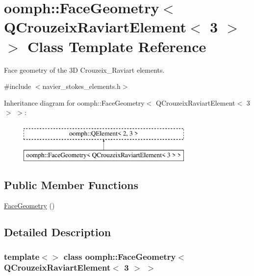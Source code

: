 \hypertarget{classoomph_1_1FaceGeometry_3_01QCrouzeixRaviartElement_3_013_01_4_01_4}{}\section{oomph\+:\+:Face\+Geometry$<$ Q\+Crouzeix\+Raviart\+Element$<$ 3 $>$ $>$ Class Template Reference}
\label{classoomph_1_1FaceGeometry_3_01QCrouzeixRaviartElement_3_013_01_4_01_4}


Face geometry of the 3D Crouzeix\+\_\+\+Raviart elements.  




{\ttfamily \#include $<$navier\+\_\+stokes\+\_\+elements.\+h$>$}

Inheritance diagram for oomph\+:\+:Face\+Geometry$<$ Q\+Crouzeix\+Raviart\+Element$<$ 3 $>$ $>$\+:\begin{figure}[H]
\begin{center}
\leavevmode
\includegraphics[height=2.000000cm]{classoomph_1_1FaceGeometry_3_01QCrouzeixRaviartElement_3_013_01_4_01_4}
\end{center}
\end{figure}
\subsection*{Public Member Functions}
\begin{DoxyCompactItemize}
\item 
\hyperlink{classoomph_1_1FaceGeometry_3_01QCrouzeixRaviartElement_3_013_01_4_01_4_a3183acb3d5e73accbd0fb5258468e377}{Face\+Geometry} ()
\end{DoxyCompactItemize}


\subsection{Detailed Description}
\subsubsection*{template$<$$>$\newline
class oomph\+::\+Face\+Geometry$<$ Q\+Crouzeix\+Raviart\+Element$<$ 3 $>$ $>$}


